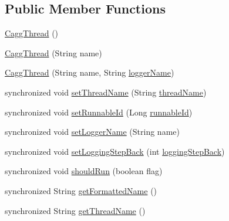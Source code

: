 \subsection*{Public Member Functions}
\begin{DoxyCompactItemize}
\item 
\hyperlink{classit_1_1emarolab_1_1cagg_1_1core_1_1evaluation_1_1CaggThread_aeb5bd569e91a81028f30e954e0f959c4}{Cagg\-Thread} ()
\item 
\hyperlink{classit_1_1emarolab_1_1cagg_1_1core_1_1evaluation_1_1CaggThread_a80f73194fbda47c2c1cc441ee81f3af6}{Cagg\-Thread} (String name)
\item 
\hyperlink{classit_1_1emarolab_1_1cagg_1_1core_1_1evaluation_1_1CaggThread_a167ead291a9d899bb54a18c7087655f2}{Cagg\-Thread} (String name, String \hyperlink{classit_1_1emarolab_1_1cagg_1_1core_1_1evaluation_1_1CaggThread_ae7dd4d1aec246c90d4a997b825978256}{logger\-Name})
\item 
synchronized void \hyperlink{classit_1_1emarolab_1_1cagg_1_1core_1_1evaluation_1_1CaggThread_a5ddbd866cec7549f961c017b1d709956}{set\-Thread\-Name} (String \hyperlink{classit_1_1emarolab_1_1cagg_1_1core_1_1evaluation_1_1CaggThread_a9f93a5dd960d289f5e2a1889f8b6f55b}{thread\-Name})
\item 
synchronized void \hyperlink{classit_1_1emarolab_1_1cagg_1_1core_1_1evaluation_1_1CaggThread_aa15cccaceabef0a9e5d528cdbadbff91}{set\-Runnable\-Id} (Long \hyperlink{classit_1_1emarolab_1_1cagg_1_1core_1_1evaluation_1_1CaggThread_a47118bd7dad8aedaf8b1d5d4b296b5d2}{runnable\-Id})
\item 
synchronized void \hyperlink{classit_1_1emarolab_1_1cagg_1_1core_1_1evaluation_1_1CaggThread_ac48ce573fae4b87b4173158416aa7356}{set\-Logger\-Name} (String name)
\item 
synchronized void \hyperlink{classit_1_1emarolab_1_1cagg_1_1core_1_1evaluation_1_1CaggThread_ac605b806365c296692cf192e16a4934f}{set\-Logging\-Step\-Back} (int \hyperlink{classit_1_1emarolab_1_1cagg_1_1core_1_1evaluation_1_1CaggThread_a1cee6eb33e519f65885ddb3a5ab6515f}{logging\-Step\-Back})
\item 
synchronized void \hyperlink{classit_1_1emarolab_1_1cagg_1_1core_1_1evaluation_1_1CaggThread_af6a1a55ea1fcd2a3affe25ad689d02d7}{should\-Run} (boolean flag)
\item 
synchronized String \hyperlink{classit_1_1emarolab_1_1cagg_1_1core_1_1evaluation_1_1CaggThread_ad8c2a5cefe661ddf7561be3e287f15cb}{get\-Formatted\-Name} ()
\item 
synchronized String \hyperlink{classit_1_1emarolab_1_1cagg_1_1core_1_1evaluation_1_1CaggThread_a684b2425f28babe37d7683f2a01b128b}{get\-Thread\-Name} ()

\end{DoxyCompactItemize}

